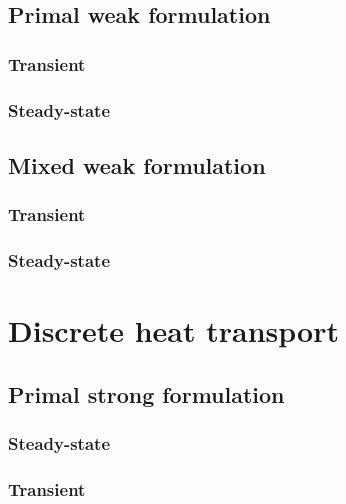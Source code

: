 \documentclass{article}
\theoremstyle{definition}
\begin{document}
\subsection{Primal weak formulation}
\subsubsection{Transient}


\subsubsection{Steady-state}

\subsection{Mixed weak formulation}
\subsubsection{Transient}


\subsubsection{Steady-state}


\section{Discrete heat transport}
\label{section:discrete_diffusion}



\subsection{Primal strong formulation}
\subsubsection{Steady-state}

\subsubsection{Transient}


\end{document}
